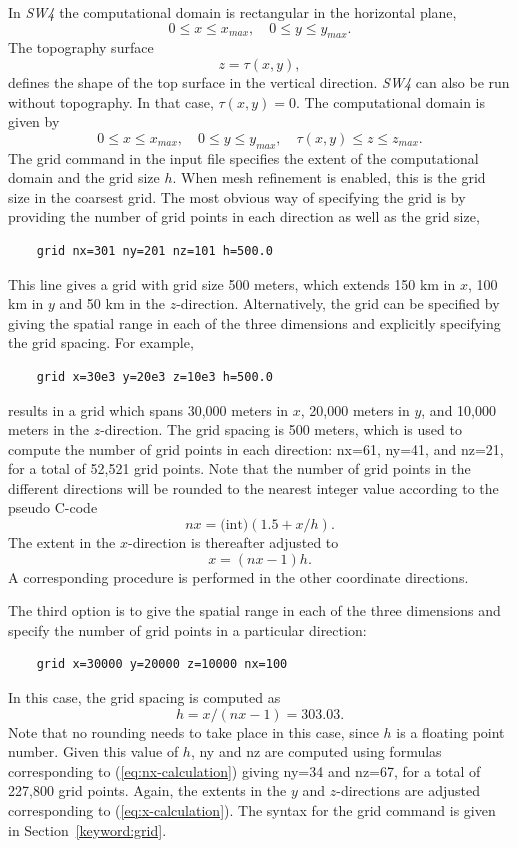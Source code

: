 \documentclass[11pt]{report}
\begin{document}
In \emph{SW4} the computational domain is rectangular in the horizontal plane,
\[
0\leq x\leq x_{max},\quad 0\leq y\leq y_{max}.
\]
The topography surface
\[
z=\tau(x,y),
\]
defines the shape of the top surface in the vertical direction. \emph{SW4} can also be run without
topography. In that case, $\tau(x,y)=0$. The computational domain is given by
\begin{equation}\label{eq:domain}
0\leq x\leq x_{max},\quad 0\leq y\leq y_{max},\quad \tau(x,y) \leq z \leq z_{max}.
\end{equation}
The grid command in the input file specifies the extent of the computational domain and the grid
size $h$. When mesh refinement is enabled, this is the grid size in the coarsest grid. The most
obvious way of specifying the grid is by providing the number of grid points in each direction as
well as the grid size,
%
\begin{verbatim}
	grid nx=301 ny=201 nz=101 h=500.0 
\end{verbatim}
%
This line gives a grid with grid size 500 meters, which extends 150 km in $x$, 100 km in $y$ and 50 km in the
$z$-direction. Alternatively, the grid can be specified by giving the spatial range in each of the three
dimensions and explicitly specifying the grid spacing. For example,
%
\begin{verbatim}
	grid x=30e3 y=20e3 z=10e3 h=500.0 
\end{verbatim}
%
results in a grid which spans 30,000 meters in $x$, 20,000 meters in $y$, and 10,000
meters in the $z$-direction.  The grid spacing is 500 meters, which is used to compute the
number of grid points in each direction: nx=61, ny=41, and nz=21, for a total of
52,521 grid points. Note that the number of grid points in the different directions will be
rounded to the nearest integer value according to the pseudo C-code
\begin{equation}\label{eq:nx-calculation}
nx = \mbox{(int)} (1.5 + x/h).
\end{equation}
The extent in the $x$-direction is thereafter adjusted to
\begin{equation}\label{eq:x-calculation}
x=(nx-1) h.
\end{equation}
A corresponding procedure is performed in the other coordinate directions.

The third option is to give the spatial range in each of the three dimensions and specify the number
of grid points in a particular direction:
%
\begin{verbatim}
	grid x=30000 y=20000 z=10000 nx=100
\end{verbatim}
%
In this case, the grid spacing is computed as 
\[
h = x/(nx-1)= 303.03.
\]
Note that no rounding needs to take place in this case, since $h$ is a floating point number. Given this
value of $h$, ny and nz are computed using formulas corresponding to
(\ref{eq:nx-calculation}) giving ny=34 and nz=67, for a total of 227,800 grid points. Again,
the extents in the $y$ and $z$-directions are adjusted corresponding to (\ref{eq:x-calculation}). The syntax
for the grid command is given in Section~\ref{keyword:grid}.
\end{document}
